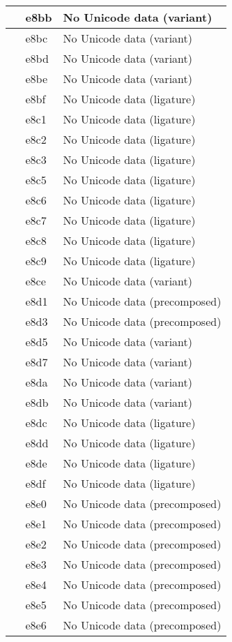 \documentclass[12pt,letterpaper,openany]{book}
\begin{document}
\begin{center}
\begin{supertabular}{|m{0.25in}|m{0.5in}|m{4in}|}
 & e8bb & No Unicode data (variant)\\\hline
 & e8bc & No Unicode data (variant)\\\hline
 & e8bd & No Unicode data (variant)\\\hline
 & e8be & No Unicode data (variant)\\\hline
 & e8bf & No Unicode data (ligature)\\\hline
 & e8c1 & No Unicode data (ligature)\\\hline
 & e8c2 & No Unicode data (ligature)\\\hline
 & e8c3 & No Unicode data (ligature)\\\hline
 & e8c5 & No Unicode data (ligature)\\\hline
 & e8c6 & No Unicode data (ligature)\\\hline
 & e8c7 & No Unicode data (ligature)\\\hline
 & e8c8 & No Unicode data (ligature)\\\hline
 & e8c9 & No Unicode data (ligature)\\\hline
 & e8ce & No Unicode data (variant)\\\hline
 & e8d1 & No Unicode data (precomposed)\\\hline
 & e8d3 & No Unicode data (precomposed)\\\hline
 & e8d5 & No Unicode data (variant)\\\hline
 & e8d7 & No Unicode data (variant)\\\hline
 & e8da & No Unicode data (variant)\\\hline
 & e8db & No Unicode data (variant)\\\hline
 & e8dc & No Unicode data (ligature)\\\hline
 & e8dd & No Unicode data (ligature)\\\hline
 & e8de & No Unicode data (ligature)\\\hline
 & e8df & No Unicode data (ligature)\\\hline
 & e8e0 & No Unicode data (precomposed)\\\hline
 & e8e1 & No Unicode data (precomposed)\\\hline
 & e8e2 & No Unicode data (precomposed)\\\hline
 & e8e3 & No Unicode data (precomposed)\\\hline
 & e8e4 & No Unicode data (precomposed)\\\hline
 & e8e5 & No Unicode data (precomposed)\\\hline
 & e8e6 & No Unicode data (precomposed)\\\hline

\end{supertabular}
\end{center}
\end{document}
